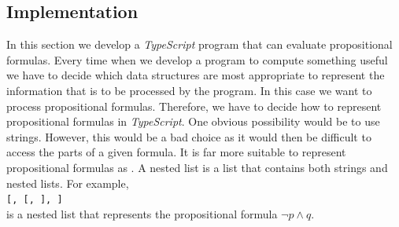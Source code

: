 \subsection{Implementation} 
In this section we develop a \textsl{TypeScript} program that can evaluate propositional formulas.
Every time when we develop a program to compute something useful we have to decide which data structures are
most appropriate to represent the information that is to be processed by the program.  In this case we want to
process propositional formulas.  Therefore, we have to decide how to represent propositional formulas in
\textsl{TypeScript}.  One obvious possibility would be to use strings.  However, this would be a bad choice as it
would then be difficult to access the parts of a given formula.  It is far more suitable to represent
propositional formulas as .  A nested list is a list that contains both strings and
nested lists.  For example,
\\[0.2cm]
\hspace*{1.3cm}
\texttt{[\tsq{$\wedge$}, [\tsq{$\neg$}, ], ]}
\\[0.2cm]
is a nested list that represents the propositional formula $\neg p \wedge q$.


